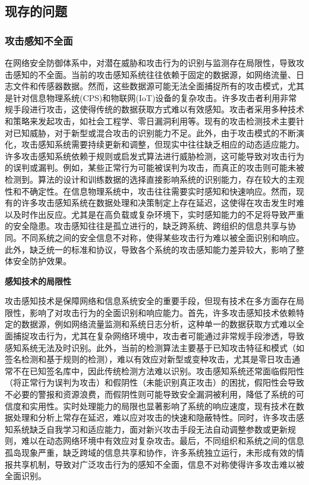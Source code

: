 \subsection{现存的问题}

\subsubsection{攻击感知不全面}

在网络安全防御体系中，对潜在威胁和攻击行为的识别与监测存在局限性，导致攻击感知的不全面。当前的攻击感知系统往往依赖于固定的数据源，如网络流量、日志文件和传感器数据。然而，这些数据源可能无法全面捕捉所有的攻击模式，尤其是针对信息物理系统(CPS)和物联网(IoT)设备的复杂攻击。许多攻击者利用非常规手段进行攻击，这使得传统的数据获取方式难以有效感知。攻击者采用多种技术和策略来发起攻击，如社会工程学、零日漏洞利用等。现有的攻击检测技术主要针对已知威胁，对于新型或混合攻击的识别能力不足。此外，由于攻击模式的不断演化，攻击感知系统需要持续更新和调整，但现实中往往缺乏相应的动态适应能力。许多攻击感知系统依赖于规则或启发式算法进行威胁检测，这可能导致对攻击行为的误判或漏判。例如，某些正常行为可能被误判为攻击，而真正的攻击则可能未被检测到。算法的设计和训练数据的选择直接影响系统的识别能力，存在较大的主观性和不确定性。在信息物理系统中，攻击往往需要实时感知和快速响应。然而，现有的许多攻击感知系统在数据处理和决策制定上存在延迟，这使得在攻击发生时难以及时作出反应。尤其是在高负载或复杂环境下，实时感知能力的不足将导致严重的安全隐患。攻击感知往往是孤立进行的，缺乏跨系统、跨组织的信息共享与协同。不同系统之间的安全信息不对称，使得某些攻击行为难以被全面识别和响应。此外，缺乏统一的标准和协议，导致各个系统的攻击感知能力差异较大，影响了整体安全防护效果。

\textbf{感知技术的局限性}

攻击感知技术是保障网络和信息系统安全的重要手段，但现有技术在多方面存在局限性，影响了对攻击行为的全面识别和响应能力。首先，许多攻击感知技术依赖特定的数据源，例如网络流量监测和系统日志分析，这种单一的数据获取方式难以全面捕捉攻击行为，尤其在复杂网络环境中，攻击者可能通过非常规手段渗透，导致感知系统无法及时识别。此外，当前的检测算法主要基于已知攻击特征和模式（如签名检测和基于规则的检测），难以有效应对新型或变种攻击，尤其是零日攻击通常不在已知签名库中，因此传统检测方法难以识别。攻击感知系统还常面临假阳性（将正常行为误判为攻击）和假阴性（未能识别真正攻击）的困扰，假阳性会导致不必要的警报和资源浪费，而假阴性则可能导致安全漏洞被利用，降低了系统的可信度和实用性。实时处理能力的局限也显著影响了系统的响应速度，现有技术在数据处理和分析上常存在延迟，难以应对攻击的快速和隐蔽特性。同时，许多攻击感知系统缺乏自我学习和适应能力，面对新兴攻击手段无法自动调整参数或更新规则，难以在动态网络环境中有效应对复杂攻击。最后，不同组织和系统之间的信息孤岛现象严重，缺乏跨域的信息共享和协作，许多系统独立运行，未形成有效的情报共享机制，导致对广泛攻击行为的感知不全面，信息不对称使得许多攻击难以被全面识别。


